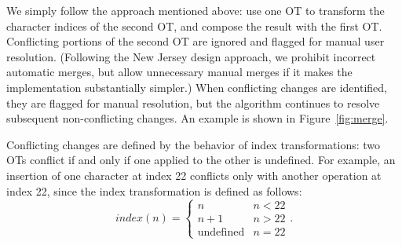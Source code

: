 \documentclass[11pt,titlepage]{article}
\begin{document}
We simply follow the approach mentioned above: use one OT to transform
the character indices of the second OT, and compose the result with
the first OT.  Conflicting portions of the second OT are ignored and
flagged for manual user resolution.  (Following the New Jersey design
approach, we prohibit incorrect automatic merges, but allow
unnecessary manual merges if it makes the implementation substantially
simpler.)  When conflicting changes are identified, they are flagged
for manual resolution, but the algorithm continues to resolve
subsequent non-conflicting changes.  An example is shown in
Figure~\ref{fig:merge}.

Conflicting changes are defined by the behavior of index
transformations: two OTs conflict if and only if one applied to the
other is undefined.  For example, an insertion of one character at
index 22 conflicts only with another operation at index 22, since the
index transformation is defined as follows:
\[ index(n) = \begin{cases} n & n < 22 \\ n+1 & n > 22 \\
  \text{undefined} & n = 22 \end{cases}. \]
\end{document}
